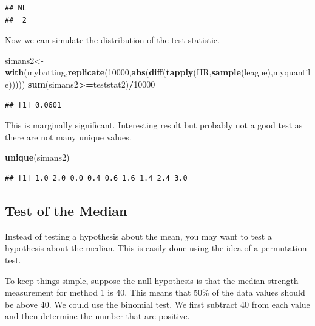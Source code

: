 \documentclass[]{book}
\newenvironment{Shaded}{\begin{snugshade}}{\end{snugshade}}
\newcommand{\KeywordTok}[1]{\textcolor[rgb]{0.13,0.29,0.53}{\textbf{#1}}}
\newcommand{\DecValTok}[1]{\textcolor[rgb]{0.00,0.00,0.81}{#1}}
\newcommand{\OperatorTok}[1]{\textcolor[rgb]{0.81,0.36,0.00}{\textbf{#1}}}
\newcommand{\NormalTok}[1]{#1}
\theoremstyle{definition}
\theoremstyle{definition}
\theoremstyle{definition}
\theoremstyle{remark}
\begin{document}
\begin{verbatim}
## NL 
##  2
\end{verbatim}

Now we can simulate the distribution of the test statistic.

\begin{Shaded}
\begin{Highlighting}[]
\NormalTok{simans2<-}\KeywordTok{with}\NormalTok{(mybatting,}\KeywordTok{replicate}\NormalTok{(}\DecValTok{10000}\NormalTok{,}\KeywordTok{abs}\NormalTok{(}\KeywordTok{diff}\NormalTok{(}\KeywordTok{tapply}\NormalTok{(HR,}\KeywordTok{sample}\NormalTok{(league),myquantile)))))}
\KeywordTok{sum}\NormalTok{(simans2}\OperatorTok{>=}\NormalTok{teststat2)}\OperatorTok{/}\DecValTok{10000}
\end{Highlighting}
\end{Shaded}

\begin{verbatim}
## [1] 0.0601
\end{verbatim}

This is marginally significant. Interesting result but probably not a
good test as there are not many unique values.

\begin{Shaded}
\begin{Highlighting}[]
\KeywordTok{unique}\NormalTok{(simans2)}
\end{Highlighting}
\end{Shaded}

\begin{verbatim}
## [1] 1.0 2.0 0.0 0.4 0.6 1.6 1.4 2.4 3.0
\end{verbatim}

\subsection{Test of the Median}\label{test-of-the-median}

Instead of testing a hypothesis about the mean, you may want to test a
hypothesis about the median. This is easily done using the idea of a
permutation test.

To keep things simple, suppose the null hypothesis is that the median
strength measurement for method 1 is 40. This means that 50\% of the
data values should be above 40. We could use the binomial test. We first
subtract 40 from each value and then determine the number that are
positive.

\begin{Shaded}
\end{Shaded}
\end{document}
